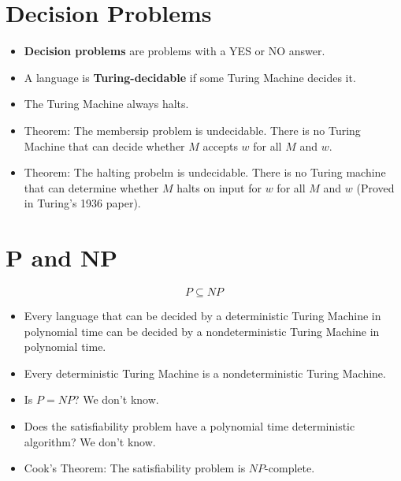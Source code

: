 \documentclass[a4paper]{article}
\begin{document}
\begin{multicols}{2}
	\section{Decision Problems}
	\begin{itemize}
		\item \textbf{Decision problems} are problems with a YES or NO answer.
		\item A language is \textbf{Turing-decidable} if some Turing Machine decides
					it.
		\item The Turing Machine always halts.
		\item Theorem: The membersip problem is undecidable. There is no Turing
					Machine that can decide whether $M$ accepts $w$ for all $M$ and $w$.
		\item Theorem: The halting probelm is undecidable. There is no Turing
					machine that can determine whether $M$ halts on input for $w$ for all
					$M$ and $w$ (Proved in Turing's 1936 paper).
	\end{itemize}

	\section{P and NP}
	$$P \subseteq NP$$
	\begin{itemize}
		\item Every language that can be decided by a deterministic Turing
					Machine in polynomial time can be decided by a nondeterministic
					Turing Machine in polynomial time.
		\item Every deterministic Turing Machine is a nondeterministic Turing
					Machine.
		\item Is $P = NP$? We don't know.
		\item Does the satisfiability problem have a polynomial time deterministic
					algorithm? We don't know.
		\item Cook's Theorem: The satisfiability problem is $NP$-complete.
	\end{itemize}

\end{multicols}
\end{document}
